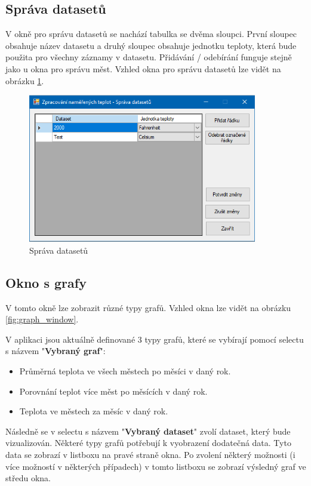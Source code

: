 \documentclass[12pt, a4paper]{article}
\begin{document}
\subsection{Správa datasetů}
V okně pro správu datasetů se nachází tabulka se dvěma sloupci. První sloupec obsahuje název datasetu a druhý sloupec obsahuje jednotku teploty, která bude použita pro všechny záznamy v datasetu. Přidávání / odebírání funguje stejně jako u okna pro správu měst. Vzhled okna pro správu datasetů lze vidět na obrázku \ref{fig:manage_datasets}.
\begin{figure}[h!]
	\centering
	\includegraphics[width=10cm]{img/manage_datasets.png}
	\caption{Správa datasetů}
	\label{fig:manage_datasets}
\end{figure}

\subsection{Okno s grafy}
V tomto okně lze zobrazit různé typy grafů. Vzhled okna lze vidět na obrázku \ref{fig:graph_window}. 

V aplikaci jsou aktuálně definované 3 typy grafů, které se vybírají pomocí selectu s názvem "\textbf{Vybraný graf}":
\begin{itemize}
\item Průměrná teplota ve všech městech po měsíci v daný rok. 
\item Porovnání teplot více měst po měsících v daný rok.
\item Teplota ve městech za měsíc v daný rok.
\end{itemize}

Následně se v selectu s názvem "\textbf{Vybraný dataset}" zvolí dataset, který bude vizualizován. Některé typy grafů potřebují k vyobrazení dodatečná data. Tyto data se zobrazí v listboxu na pravé straně okna. Po zvolení některý možnosti (i více možností v některých případech) v tomto listboxu se zobrazí výsledný graf ve středu okna.
\end{document}

